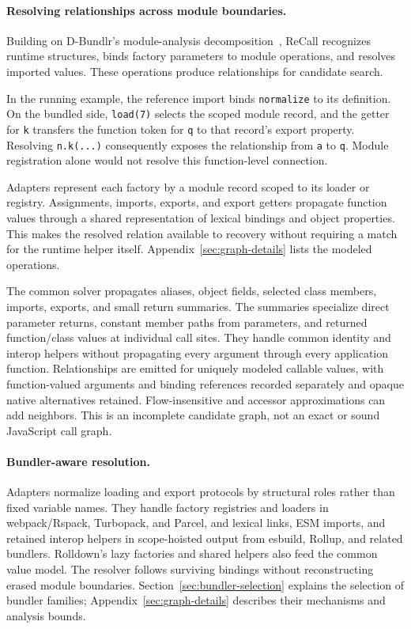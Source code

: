 \paragraph{Resolving relationships across module boundaries.}
Building on D-Bundlr's module-analysis decomposition~\cite{xu2026dbundlr}, ReCall recognizes runtime structures, binds factory parameters to module operations, and resolves imported values. These operations produce relationships for candidate search.

In the running example, the reference import binds \texttt{normalize} to its definition. On the bundled side, \texttt{load(7)} selects the scoped module record, and the getter for \texttt{k} transfers the function token for \texttt{q} to that record's export property. Resolving \texttt{n.k(...)} consequently exposes the relationship from \texttt{a} to \texttt{q}. Module registration alone would not resolve this function-level connection.

Adapters represent each factory by a module record scoped to its loader or registry. Assignments, imports, exports, and export getters propagate function values through a shared representation of lexical bindings and object properties. This makes the resolved relation available to recovery without requiring a match for the runtime helper itself. Appendix~\ref{sec:graph-details} lists the modeled operations.

The common solver propagates aliases, object fields, selected class members, imports, exports, and small return summaries. The summaries specialize direct parameter returns, constant member paths from parameters, and returned function/class values at individual call sites. They handle common identity and interop helpers without propagating every argument through every application function. Relationships are emitted for uniquely modeled callable values, with function-valued arguments and binding references recorded separately and opaque native alternatives retained. Flow-insensitive and accessor approximations can add neighbors. This is an incomplete candidate graph, not an exact or sound JavaScript call graph.

\paragraph{Bundler-aware resolution.}
\label{sec:bundler-adapters}
Adapters normalize loading and export protocols by structural roles rather than fixed variable names. They handle factory registries and loaders in webpack/Rspack, Turbopack, and Parcel, and lexical links, ESM imports, and retained interop helpers in scope-hoisted output from esbuild, Rollup, and related bundlers. Rolldown's lazy factories and shared helpers also feed the common value model. The resolver follows surviving bindings without reconstructing erased module boundaries. Section~\ref{sec:bundler-selection} explains the selection of bundler families; Appendix~\ref{sec:graph-details} describes their mechanisms and analysis bounds.

